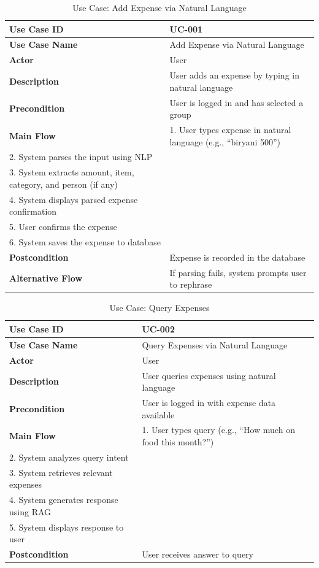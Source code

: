 \begin{table}[H]
\centering
\caption{Use Case: Add Expense via Natural Language}
\label{tab:uc-add-expense}
\begin{tabular}{|p{4cm}|p{9cm}|}
\hline
\textbf{Use Case ID} & UC-001 \\
\hline
\textbf{Use Case Name} & Add Expense via Natural Language \\
\hline
\textbf{Actor} & User \\
\hline
\textbf{Description} & User adds an expense by typing in natural language \\
\hline
\textbf{Precondition} & User is logged in and has selected a group \\
\hline
\textbf{Main Flow} & 
1. User types expense in natural language (e.g., ``biryani 500'')\\
2. System parses the input using NLP\\
3. System extracts amount, item, category, and person (if any)\\
4. System displays parsed expense confirmation\\
5. User confirms the expense\\
6. System saves the expense to database \\
\hline
\textbf{Postcondition} & Expense is recorded in the database \\
\hline
\textbf{Alternative Flow} & If parsing fails, system prompts user to rephrase \\
\hline
\end{tabular}
\end{table}

\begin{table}[H]
\centering
\caption{Use Case: Query Expenses}
\label{tab:uc-query}
\begin{tabular}{|p{4cm}|p{9cm}|}
\hline
\textbf{Use Case ID} & UC-002 \\
\hline
\textbf{Use Case Name} & Query Expenses via Natural Language \\
\hline
\textbf{Actor} & User \\
\hline
\textbf{Description} & User queries expenses using natural language \\
\hline
\textbf{Precondition} & User is logged in with expense data available \\
\hline
\textbf{Main Flow} & 
1. User types query (e.g., ``How much on food this month?'')\\
2. System analyzes query intent\\
3. System retrieves relevant expenses\\
4. System generates response using RAG\\
5. System displays response to user \\
\hline
\textbf{Postcondition} & User receives answer to query \\
\hline
\end{tabular}
\end{table}

